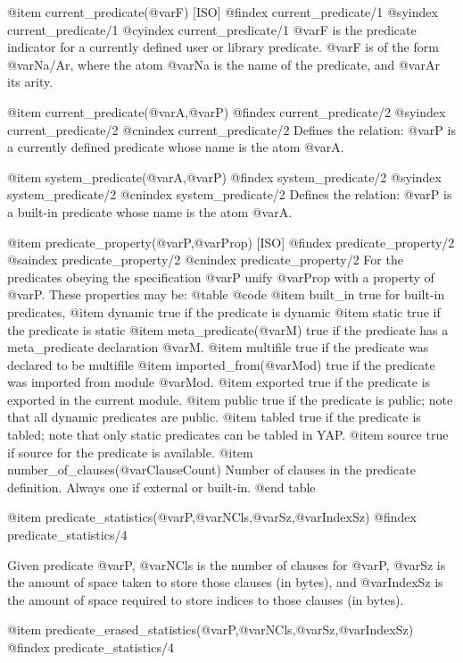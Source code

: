 {{{{{{@item current_predicate(@var{F}) [ISO]
@findex current_predicate/1
@syindex current_predicate/1
@cyindex current_predicate/1
@var{F} is the predicate indicator for a currently defined user or
library predicate. @var{F} is of the form @var{Na/Ar}, where the atom
@var{Na} is the name of the predicate, and @var{Ar} its arity.

@item current_predicate(@var{A},@var{P})
@findex current_predicate/2
@syindex current_predicate/2
@cnindex current_predicate/2
Defines the relation: @var{P} is a currently defined predicate whose
name is the atom @var{A}.

@item system_predicate(@var{A},@var{P})
@findex system_predicate/2
@syindex system_predicate/2
@cnindex system_predicate/2
Defines the relation:  @var{P} is a built-in predicate whose name
is the atom @var{A}.

@item predicate_property(@var{P},@var{Prop}) [ISO]
@findex predicate_property/2
@saindex predicate_property/2
@cnindex predicate_property/2
For the predicates obeying the specification @var{P} unify @var{Prop}
with a property of @var{P}. These properties may be:
@table @code
@item built_in
true for built-in predicates,
@item dynamic
true if the predicate is dynamic
@item static
true if the predicate is static
@item meta_predicate(@var{M})
true if the predicate has a meta_predicate declaration @var{M}.
@item multifile
true if the predicate was declared to be multifile
@item imported_from(@var{Mod})
true if the predicate was imported from module @var{Mod}.
@item exported
true if the predicate is exported in the current module.
@item public
true if the predicate is public; note that all dynamic predicates are
public.
@item tabled
true if the predicate is tabled; note that only static predicates can
be tabled in YAP.
@item source
true if source for the predicate is available.
@item number_of_clauses(@var{ClauseCount})
Number of clauses in the predicate definition. Always one if external
or built-in.
@end table

@item predicate_statistics(@var{P},@var{NCls},@var{Sz},@var{IndexSz}) 
@findex predicate_statistics/4

Given predicate @var{P}, @var{NCls} is the number of clauses for
@var{P}, @var{Sz} is the amount of space taken to store those clauses
(in bytes), and @var{IndexSz} is the amount of space required to store
indices to those clauses (in bytes).

@item predicate_erased_statistics(@var{P},@var{NCls},@var{Sz},@var{IndexSz}) 
@findex predicate_statistics/4

}}}}}}
